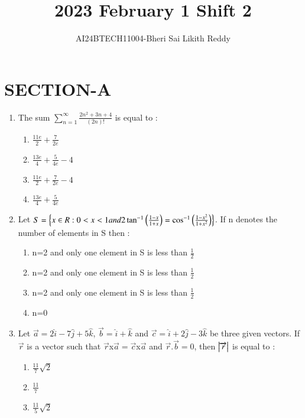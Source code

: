 \documentclass[journal]{IEEEtran}
\begin{document}

\onecolumn
\newpage
\title{2023 February 1 Shift 2}
\author{AI24BTECH11004-Bheri Sai Likith Reddy}
\maketitle
\section{SECTION-A}
\begin{enumerate}
       \item The sum $\sum_{n=1}^\infty \frac{2n^2+3n+4}{(2n)!}$ is equal to :
	       \begin{enumerate}
		       \item $\frac{11e}{2}+\frac{7}{2e}$
		       \item $\frac{13e}{4}+\frac{5}{4e}-4$
			\item $\frac{11e}{2}+\frac{7}{2e}-4$
			\item $\frac{13e}{4}+\frac{5}{4e}$
        	\end{enumerate}	
	\item Let $S=\left\{x\in R: 0<x<1 and 2\tan ^{-1}\left(\frac{1-x}{1+x}\right)=\cos ^{-1}\left(\frac{1-x^2}{1+x^2}\right)\right\}$. If n denotes the number of elements in S then :
               \begin{enumerate}
			       \item n=2 and only one element in S is less than $\frac{1}{2}$
                                \item n=2 and only one element in S is less than $\frac{1}{2}$
				\item n=2 and only one element in S is less than $\frac{1}{2}$ 
                                \item n=0
	       \end{enumerate}	
       \item Let $\overrightarrow{a}=2\hat{i}-7\hat{j}+5\hat{k}$, $\overrightarrow{b}=\hat{i}+\hat{k}$ and $\overrightarrow{c}=\hat{i}+2\hat{j}-3\hat{k}$ be three given vectors. If $\overrightarrow{r}$ is a vector such that $\overrightarrow{r}$x$\overrightarrow{a}=\overrightarrow{c}$x$\overrightarrow{a}$ and $\overrightarrow{r}.\overrightarrow{b}=0$, then $\left\vert\overrightarrow{r}\right\vert$ is equal to :
		\begin{enumerate}
			\item $\frac{11}{7}\sqrt{2}$
			\item $\frac{11}{7}$
			\item $\frac{11}{5}\sqrt{2}$

\end{enumerate}
\end{enumerate}
\end{document}
